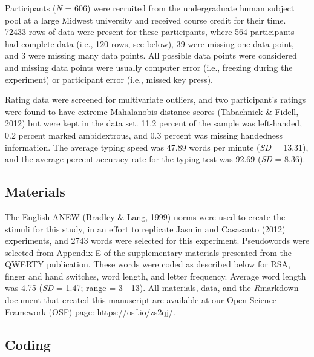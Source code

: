 \documentclass[
  english,
  man,mask]{apa7}
\begin{document}
Participants (\emph{N} = 606) were recruited from the undergraduate human subject pool at a large Midwest university and received course credit for their time. 72433 rows of data were present for these participants, where 564 participants had complete data (i.e., 120 rows, see below), 39 were missing one data point, and 3 were missing many data points. All possible data points were considered and missing data points were usually computer error (i.e., freezing during the experiment) or participant error (i.e., missed key press).

Rating data were screened for multivariate outliers, and two participant's ratings were found to have extreme Mahalanobis distance scores (Tabachnick \& Fidell, 2012) but were kept in the data set. 11.2 percent of the sample was left-handed, 0.2 percent marked ambidextrous, and 0.3 percent was missing handedness information. The average typing speed was 47.89 words per minute (\emph{SD} = 13.31), and the average percent accuracy rate for the typing test was 92.69 (\emph{SD} = 8.36).

\hypertarget{materials}{%
\subsection{Materials}\label{materials}}

The English ANEW (Bradley \& Lang, 1999) norms were used to create the stimuli for this study, in an effort to replicate Jasmin and Casasanto (2012) experiments, and 2743 words were selected for this experiment. Pseudowords were selected from Appendix E of the supplementary materials presented from the QWERTY publication. These words were coded as described below for RSA, finger and hand switches, word length, and letter frequency. Average word length was 4.75 (\emph{SD} = 1.47; range = 3 - 13). All materials, data, and the \emph{R}markdown document that created this manuscript are available at our Open Science Framework (OSF) page: \url{https://osf.io/zs2qj/}.

\hypertarget{coding}{%
\subsection{Coding}\label{coding}}
\end{document}

